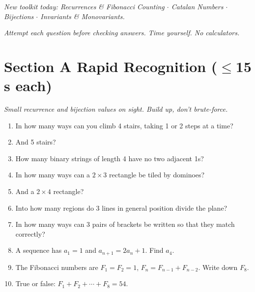 \documentclass[11pt,a4paper]{article}
\begin{document}
\noindent\textit{New toolkit today: Recurrences \& Fibonacci Counting $\cdot$ Catalan Numbers $\cdot$ Bijections $\cdot$ Invariants \& Monovariants.}

\vspace{2pt}
\noindent\textit{Attempt each question before checking answers. Time yourself. No calculators.}

\section*{Section A \quad Rapid Recognition \hfill{\normalfont\small($\leq$15 s each)}}

\noindent\textit{Small recurrence and bijection values on sight. Build up, don't brute-force.}

\begin{enumerate}

\item In how many ways can you climb 4 stairs, taking 1 or 2 steps at a time?

\item And 5 stairs?

\item How many binary strings of length 4 have no two adjacent 1s?

\item In how many ways can a $2\times3$ rectangle be tiled by dominoes?

\item And a $2\times4$ rectangle?

\item Into how many regions do 3 lines in general position divide the plane?

\item In how many ways can 3 pairs of brackets be written so that they match correctly?

\item A sequence has $a_1=1$ and $a_{n+1}=2a_n+1$. Find $a_4$.

\item The Fibonacci numbers are $F_1=F_2=1$, $F_{n}=F_{n-1}+F_{n-2}$. Write down $F_8$.

\item True or false: $F_1+F_2+\cdots+F_8=54$.

\end{enumerate}
\end{document}
